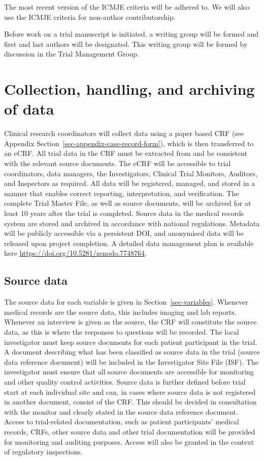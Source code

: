 \documentclass[
]{scrartcl}
\begin{document}
The most recent version of the ICMJE criteria will be adhered to. We
will also use the ICMJE criteria for non-author contributorship.

Before work on a trial manuscript is initiated, a writing group will be
formed and first and last authors will be designated. This writing group
will be formed by discussion in the Trial Management Group.

\hypertarget{collection-handling-and-archiving-of-data}{%
\section{Collection, handling, and archiving of
data}\label{collection-handling-and-archiving-of-data}}

Clinical research coordinators will collect data using a paper based CRF
(see Appendix Section~\ref{sec-appendix-case-record-form}), which is
then transferred to an eCRF. All trial data in the CRF must be extracted
from and be consistent with the relevant source documents. The eCRF will
be accessible to trial coordinators, data managers, the Investigators,
Clinical Trial Monitors, Auditors, and Inspectors as required. All data
will be registered, managed, and stored in a manner that enables correct
reporting, interpretation, and verification. The complete Trial Master
File, as well as source documents, will be archived for at least 10
years after the trial is completed. Source data in the medical records
system are stored and archived in accordance with national regulations.
Metadata will be publicly accessible via a persistent DOI, and
anonymised data will be released upon project completion. A detailed
data management plan is available here
\url{https://doi.org/10.5281/zenodo.7748764}.

\hypertarget{source-data}{%
\subsection{Source data}\label{source-data}}

The source data for each variable is given in
Section~\ref{sec-variables}. Whenever medical records are the source
data, this includes imaging and lab reports. Whenever an interview is
given as the source, the CRF will constitute the source data, as this is
where the responses to questions will be recorded. The local
investigator must keep source documents for each patient participant in
the trial. A document describing what has been classified as source data
in the trial (source data reference document) will be included in the
Investigator Site File (ISF). The investigator must ensure that all
source documents are accessible for monitoring and other quality control
activities. Source data is further defined before trial start at each
individual site and can, in cases where source data is not registered in
another document, consist of the CRF. This should be decided in
consultation with the monitor and clearly stated in the source data
reference document. Access to trial-related documentation, such as
patient participants' medical records, CRFs, other source data and other
trial documentation will be provided for monitoring and auditing
purposes. Access will also be granted in the context of regulatory
inspections.
\end{document}
